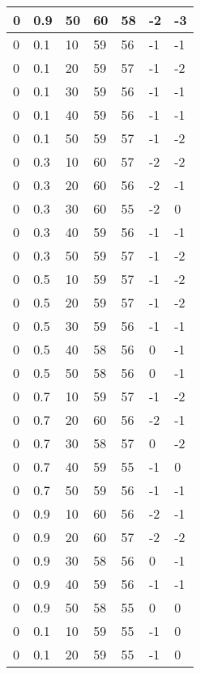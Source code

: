 \begin{longtable}{|l|l|l|l|l|l|l|}
		0     & 0.9 & 50   & 60 & 58 & -2  & -3  \\ \hline
		0     & 0.1 & 10   & 59 & 56 & -1  & -1  \\ \hline
		0     & 0.1 & 20   & 59 & 57 & -1  & -2  \\ \hline
		0     & 0.1 & 30   & 59 & 56 & -1  & -1  \\ \hline
		0     & 0.1 & 40   & 59 & 56 & -1  & -1  \\ \hline
		0     & 0.1 & 50   & 59 & 57 & -1  & -2  \\ \hline
		0     & 0.3 & 10   & 60 & 57 & -2  & -2  \\ \hline
		0     & 0.3 & 20   & 60 & 56 & -2  & -1  \\ \hline
		0     & 0.3 & 30   & 60 & 55 & -2  & 0   \\ \hline
		0     & 0.3 & 40   & 59 & 56 & -1  & -1  \\ \hline
		0     & 0.3 & 50   & 59 & 57 & -1  & -2  \\ \hline
		0     & 0.5 & 10   & 59 & 57 & -1  & -2  \\ \hline
		0     & 0.5 & 20   & 59 & 57 & -1  & -2  \\ \hline
		0     & 0.5 & 30   & 59 & 56 & -1  & -1  \\ \hline
		0     & 0.5 & 40   & 58 & 56 & 0   & -1  \\ \hline
		0     & 0.5 & 50   & 58 & 56 & 0   & -1  \\ \hline
		0     & 0.7 & 10   & 59 & 57 & -1  & -2  \\ \hline
		0     & 0.7 & 20   & 60 & 56 & -2  & -1  \\ \hline
		0     & 0.7 & 30   & 58 & 57 & 0   & -2  \\ \hline
		0     & 0.7 & 40   & 59 & 55 & -1  & 0   \\ \hline
		0     & 0.7 & 50   & 59 & 56 & -1  & -1  \\ \hline
		0     & 0.9 & 10   & 60 & 56 & -2  & -1  \\ \hline
		0     & 0.9 & 20   & 60 & 57 & -2  & -2  \\ \hline
		0     & 0.9 & 30   & 58 & 56 & 0   & -1  \\ \hline
		0     & 0.9 & 40   & 59 & 56 & -1  & -1  \\ \hline
		0     & 0.9 & 50   & 58 & 55 & 0   & 0   \\ \hline
		0     & 0.1 & 10   & 59 & 55 & -1  & 0   \\ \hline
		0     & 0.1 & 20   & 59 & 55 & -1  & 0   \\ \hline

\end{longtable}
